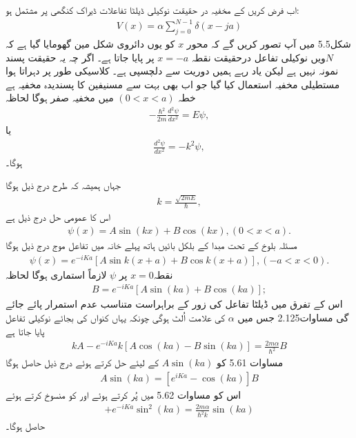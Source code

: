\documentclass[leqno, b5paper]{khalid-urdu-book}
\begin{document}
اب فرض کریں کے مخفیہ در حقیقت نوکیلی ڈیلٹا تفاعلات ڈیراک کنگھی پر مشتمل ہو:
\begin{align}
	V(x) = \alpha\sum_{j=0}^{N-1}\delta(x-ja)
\end{align}
شکل\num{5.5} میں آپ تصور کریں گے  کہ محور $x$ کو یوں دائروی شکل مین گھومایا گیا ہے کہ $N$ویں نوکیلی تفاعل درحقیقت نقطہ \(x= -a\)  پر پایا جاتا ہے۔ اگر چہ یہ حقیقت پسند نمونہ نہیں ہے لیکن یاد رہے ہمیں دوریت سے دلچسپی ہے۔ کلاسیکی طور پر دہراتا ہوا مستطیلی مخفیہ استعمال کیا گیا جو اب بھی بہت سے مسنیفین کا پسندیدہ مخفیہ ہے خطہ \((0<x<a)\) میں مخفیہ صفر ہوگا لحاظہ 
\begin{align*}
	-\frac{\hbar^{2}}{2m}\frac{d^{2}\psi}{dx^{2}} = E\psi,
\end{align*}
یا
\begin{align*}
	\frac{d^{2}\psi}{dx^{2}} = -k^{2}\psi,
\end{align*}
ہوگا۔

جہاں ہمیشہ کہ طرح درج ذیل ہوگا 
\begin{align}
	k = \frac{\sqrt{2mE}}{\hbar},
\end{align}
اس کا عمومی حل درج ذیل ہے 
\begin{align}
	\psi(x) = A\sin(kx) + B\cos(kx), (0<x<a).
\end{align}
مسئلہ بلوخ کے تحت مبدا کے بلکل بائیں ہاتھ پہلے خانہ میں تفاعل موج درج ذیل ہوگا 
\begin{align}
	\psi(x) = e^{-iKa}[A\sin k(x+a) + B\cos k(x+a)], (-a<x<0). 
\end{align}
نقطہ\(x=0\) پر $\psi$ لازماً استماری ہوگا لحاظہ 
\begin{align}
	B = e^{-iKa}[A\sin(ka) + B\cos(ka)];
\end{align}
اس کے تفرق میں ڈیلٹا تفاعل کی زور کے براہراست متناسب عدم استمرار پائے جائے گی مساوات\num{2.125} جس میں $\alpha$ کی علامت اُلٹ ہوگی چونکہ یہاں کنواں کی بجائے نوکیلی تفاعل پایا جاتا ہے
\begin{align}
	kA - e^{-iKa}k[A\cos(ka) - B\sin(ka)] = \frac{2m\alpha}{\hbar^{2}}B
\end{align}
مساوات \num{5.61} کو \(A\sin(ka)\) کے لیئے حل کرتے ہوئے درج ذیل حاصل ہوگا 
\begin{align}
	A\sin(ka) = [e^{iKa}-\cos(ka)]B
\end{align}
اس کو مساوات \num{5.62} میں پُر کرتے ہوئے اور  کو منسوخ کرتے ہوئے 
\begin{align*}
	[e^{iKa}-\cos(ka)][1-e^{-iKa}\cos(ka)] + e^{-iKa}\sin^{2}(ka) = \frac{2m\alpha}{\hbar^{2}k}\sin(ka)
\end{align*}
حاصل ہوگا۔
\end{document}
